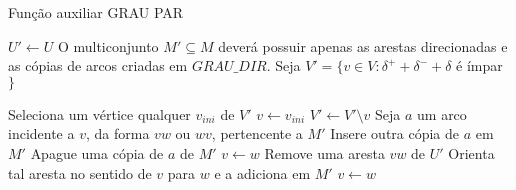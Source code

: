     \begin{algorithm}
    \caption{Função auxiliar GRAU PAR}
    \label{mixed-grau-par}
    \begin{algorithmic}[1]
            \State $U' \gets U$
            \State O multiconjunto $M' \subseteq M$ deverá possuir apenas as arestas direcionadas e as cópias de arcos criadas em $GRAU\_DIR$.
            \State Seja $V' = \{v \in V : \delta^+ + \delta^- + \delta$ é ímpar $\}$

                \State Seleciona um vértice qualquer $v_{ini}$ de $V'$ 
                \State $v \gets v_{ini}$
                    \State $V' \gets V' \setminus v$
                    \Repeat 
                        \State Seja $a$ um arco incidente a $v$, da forma $vw$ ou $wv$, pertencente a $M'$
                            \State Insere outra cópia de $a$ em $M'$ \label{alg:duplica}
                        \Else
                            \State Apague uma cópia de $a$ de $M'$ \label{alg:deleta}
                        \EndIf
                        \State $v \gets w$
                    \Repeat
                        \State Remove uma aresta $vw$ de $U'$
                        \State Orienta tal aresta no sentido de $v$ para $w$ e a adiciona em $M'$ \label{alg:orienta}
                        \State $v \gets w$
                \EndWhile
            \EndWhile
        \EndFunction
    \end{algorithmic}
    \end{algorithm}

